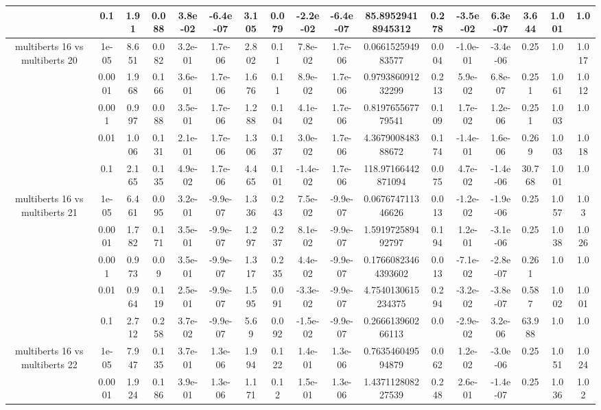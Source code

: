 \begin{tabular}{|c|c|c|c|c|c|c|c|c|c|c|c|c|c|c|c|c|}
 & 0.1 & 1.91 & 0.088 & 3.8e-02 & -6.4e-07 & 3.105 & 0.079 & -2.2e-02 & -6.4e-07 & 85.89529418945312 & 0.278 & -3.5e-02 & 6.3e-07 & 3.644 & 1.001 & 1.0 \\
\hline
\multirow{5}{*}{multiberts 16 vs multiberts 20} & 1e-05 & 8.651 & 0.082 & 3.2e-01 & 1.7e-06 & 2.802 & 0.11 & 7.8e-02 & 1.7e-06 & 0.066152594983577 & 0.004 & -1.0e-01 & -3.4e-06 & 0.25 & 1.0 & 1.017 \\
 & 0.0001 & 1.968 & 0.166 & 3.6e-01 & 1.7e-06 & 1.676 & 0.11 & 8.9e-02 & 1.7e-06 & 0.979386091232299 & 0.213 & 5.9e-02 & 6.8e-07 & 0.251 & 1.061 & 1.012 \\
 & 0.001 & 0.997 & 0.088 & 3.5e-01 & 1.7e-06 & 1.288 & 0.104 & 4.1e-02 & 1.7e-06 & 0.819765567779541 & 0.109 & 1.7e-02 & 1.2e-06 & 0.251 & 1.003 & 1.0 \\
 & 0.01 & 1.006 & 0.131 & 2.1e-01 & 1.7e-06 & 1.306 & 0.137 & 3.0e-02 & 1.7e-06 & 4.367900848388672 & 0.174 & -1.4e-01 & 1.6e-06 & 0.269 & 1.003 & 1.018 \\
 & 0.1 & 2.165 & 0.135 & 4.9e-02 & 1.7e-06 & 4.465 & 0.101 & -1.4e-02 & 1.7e-06 & 118.97166442871094 & 0.075 & 4.7e-02 & -1.4e-06 & 30.768 & 1.001 & 1.0 \\
\hline
\multirow{5}{*}{multiberts 16 vs multiberts 21} & 1e-05 & 6.461 & 0.095 & 3.2e-01 & -9.9e-07 & 1.336 & 0.243 & 7.5e-02 & -9.9e-07 & 0.067674711346626 & 0.013 & -1.2e-02 & -1.9e-06 & 0.25 & 1.057 & 1.03 \\
 & 0.0001 & 1.782 & 0.171 & 3.5e-01 & -9.9e-07 & 1.297 & 0.237 & 8.1e-02 & -9.9e-07 & 1.591972589492797 & 0.194 & 1.2e-01 & -3.1e-06 & 0.25 & 1.038 & 1.026 \\
 & 0.001 & 0.973 & 0.09 & 3.5e-01 & -9.9e-07 & 1.317 & 0.235 & 4.4e-02 & -9.9e-07 & 0.17660823464393602 & 0.013 & -7.1e-02 & -2.8e-07 & 0.261 & 1.0 & 1.0 \\
 & 0.01 & 0.964 & 0.119 & 2.5e-01 & -9.9e-07 & 1.595 & 0.091 & -3.3e-02 & -9.9e-07 & 4.7540130615234375 & 0.294 & -3.2e-02 & -3.8e-07 & 0.587 & 1.002 & 1.001 \\
 & 0.1 & 2.712 & 0.258 & 3.7e-02 & -9.9e-07 & 5.69 & 0.092 & -1.5e-02 & -9.9e-07 & 0.266613960266113 & 0.0 & -2.9e-02 & 3.2e-06 & 63.988 & 1.0 & 1.0 \\
\hline
\multirow{5}{*}{multiberts 16 vs multiberts 22} & 1e-05 & 7.947 & 0.135 & 3.7e-01 & 1.3e-06 & 1.994 & 0.122 & 1.4e-01 & 1.3e-06 & 0.763546049594879 & 0.062 & 1.2e-02 & -3.0e-06 & 0.25 & 1.051 & 1.024 \\
 & 0.0001 & 1.924 & 0.186 & 3.9e-01 & 1.3e-06 & 1.171 & 0.12 & 1.5e-01 & 1.3e-06 & 1.437112808227539 & 0.248 & 2.6e-01 & -1.4e-07 & 0.25 & 1.036 & 1.02 \\

\end{tabular}
